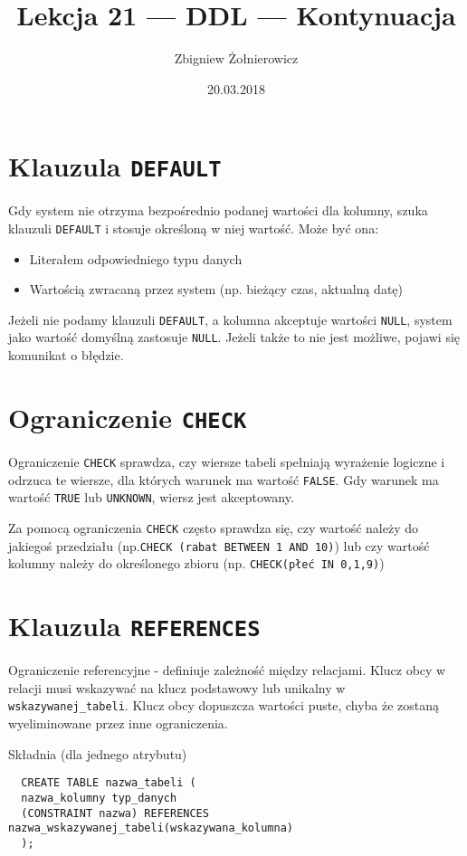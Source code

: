 \documentclass[a4paper]{article}
\begin{document}
\title{Lekcja 21 --- DDL --- Kontynuacja}
\author{Zbigniew Żołnierowicz}
\date{20.03.2018}
\maketitle
\section{Klauzula {\tt DEFAULT}}
Gdy system nie otrzyma bezpośrednio podanej wartości dla kolumny, szuka klauzuli {\tt DEFAULT} i stosuje określoną w niej wartość. Może być ona: 
\begin{itemize}
  \item Literałem odpowiedniego typu danych
  \item Wartością zwracaną przez system (np. bieżący czas, aktualną datę)
\end{itemize}
Jeżeli nie podamy klauzuli {\tt DEFAULT}, a kolumna akceptuje wartości {\tt NULL}, system jako wartość domyślną zastosuje {\tt NULL}. Jeżeli także to nie jest możliwe, pojawi się komunikat o błędzie.
\section{Ograniczenie {\tt CHECK}}
Ograniczenie {\tt CHECK} sprawdza, czy wiersze tabeli spełniają wyrażenie logiczne i odrzuca te wiersze, dla których warunek ma wartość {\tt FALSE}. Gdy warunek ma wartość {\tt TRUE} lub {\tt UNKNOWN}, wiersz jest akceptowany.

Za pomocą ograniczenia {\tt CHECK} często sprawdza się, czy wartość należy do jakiegoś przedziału (np.\texttt{CHECK (rabat BETWEEN 1 AND 10)}) lub czy wartość kolumny należy do określonego zbioru (np. \texttt{CHECK(płeć IN 0,1,9)})
\section{Klauzula {\tt REFERENCES}}
Ograniczenie referencyjne - definiuje zależność między relacjami. Klucz obcy w relacji musi wskazywać na klucz podstawowy lub unikalny w {\tt wskazywanej\_tabeli}.
Klucz obcy dopuszcza wartości puste, chyba że zostaną wyeliminowane przez inne ograniczenia.

Składnia (dla jednego atrybutu)
\begin{verbatim}
  CREATE TABLE nazwa_tabeli (
  nazwa_kolumny typ_danych
  (CONSTRAINT nazwa) REFERENCES nazwa_wskazywanej_tabeli(wskazywana_kolumna)
  );
\end{verbatim}
\end{document}
